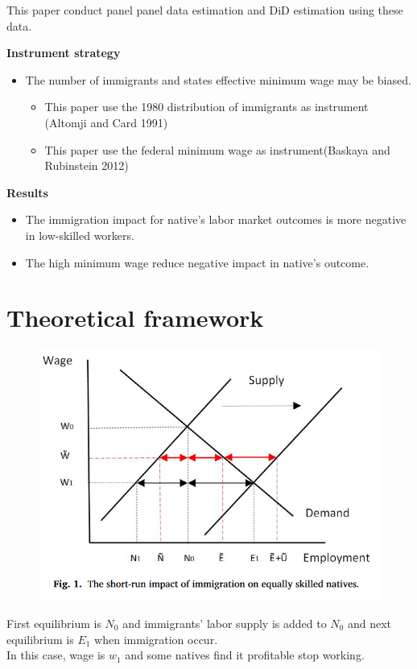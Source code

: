 \documentclass[../root]{subfiles}
\begin{document}
    This paper conduct panel panel data estimation and DiD estimation using these data. 

    {\bf Instrument strategy}
    \begin{itemize}
        \item The number of immigrants and states effective minimum wage may be biased.
        \begin{itemize}
            \item This paper use the 1980 distribution of immigrants as instrument (Altomji and Card 1991) 
            \item This paper use the federal minimum wage as instrument(Baskaya and Rubinstein 2012)
        \end{itemize}
    \end{itemize}
    
    {\bf Results}
    \begin{itemize}
        \item The immigration impact for native's labor market outcomes is more negative in low-skilled workers.
        \item The high minimum wage reduce negative impact in native's outcome.  
    \end{itemize}

    \section{Theoretical framework}
    \begin{figure}[h]
        \includegraphics[width=12cm]{0612sugiyama/figure1.png}
    \end{figure}

    First equilibrium is $N_0$ and immigrants' labor supply  is added to $N_0$ and next equilibrium is $E_1$ when immigration  occur. \\
    In this case, wage is $w_1$ and some natives find it profitable stop working. \\
\end{document}
